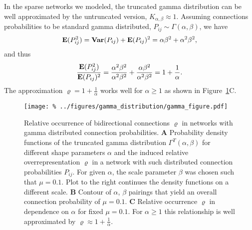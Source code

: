 In the sparse networks we modeled, the truncated gamma distribution
can be well approximated by the untruncated version, $K_{\alpha,
  \beta} \approx 1$. Assuming connections probabilities to be standard
gamma distributed, $P_{ij} \sim \Gamma(\alpha,\beta)$, we have
\begin{align}
  \operatorname{\mathbf{E}}(P_{ij}^2) = \operatorname{\mathbf{Var}}(P_{ij}) + \operatorname{\mathbf{E}}(P_{ij})^2 =  \alpha \beta^2 + \alpha^2 \beta^2, 
\end{align}
and thus
\begin{align}
  \frac{\operatorname{\mathbf{E}}(P_{ij}^2)}{\operatorname{\mathbf{E}}(P_{ij})^2} = \frac{\alpha^2 \beta^2}{\alpha^2 \beta^2} + \frac{\alpha \beta^2}{\alpha^2 \beta^2} =
 1 + \frac{1}{\alpha}.
\end{align}
The approximation $\varrho = 1 + \frac{1}{\alpha}$ works well for
$\alpha \geq 1$ as shown in Figure~\ref{fig:gd}C.




\begin{figure}[h!]
\centering
\texttt{[image: \%
  ../figures/gamma\_distribution/gamma\_figure.pdf]}
\caption{Relative occurrence of bidirectional connections $\varrho$ in
  networks with gamma distributed connection probabilities. \textbf{A}
  Probability density functions of the truncated gamma distribution
  $\Gamma^T(\alpha,\beta)$ for different shape parameters $\alpha$ and
  the induced relative overrepresentation $\varrho$ in a network with
  such distributed connection probabilities $P_{ij}$. For given
  $\alpha$, the scale parameter $\beta$ was chosen such that $\mu =
  0.1$. Plot to the right continues the density functions on a
  different scale. \textbf{B} Contour of $\alpha$, $\beta$ pairings
  that yield an overall connection probability of $\mu =
  0.1$. \textbf{C} Relative occurrence $\varrho$ in dependence on
  $\alpha$ for fixed $\mu = 0.1$. For $\alpha \geq 1$ this
  relationship is well approximated by $\varrho \approx 1 +
  \frac{1}{\alpha}$.}
\label{fig:gd}
\end{figure}

